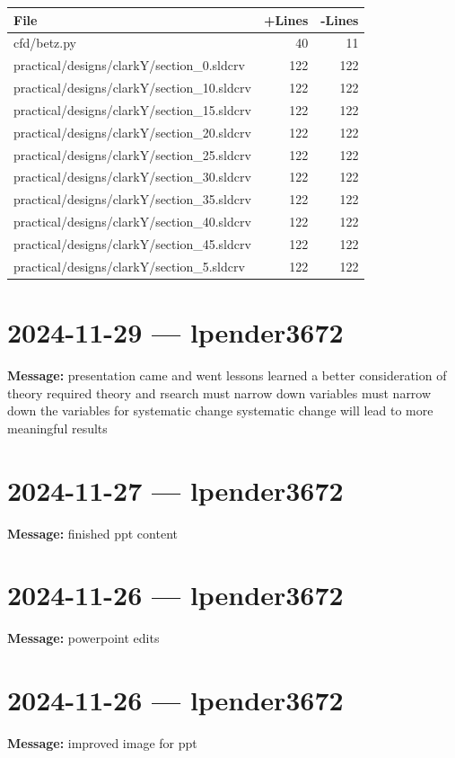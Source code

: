 \documentclass{article}
\begin{document}
\begin{longtable}{|p{10cm}|r|r|}
\hline \textbf{File} & \textbf{+Lines} & \textbf{-Lines} \\
\hline
cfd/betz.py & 40 & 11 \\
\hline
practical/designs/clarkY/section\_0.sldcrv & 122 & 122 \\
\hline
practical/designs/clarkY/section\_10.sldcrv & 122 & 122 \\
\hline
practical/designs/clarkY/section\_15.sldcrv & 122 & 122 \\
\hline
practical/designs/clarkY/section\_20.sldcrv & 122 & 122 \\
\hline
practical/designs/clarkY/section\_25.sldcrv & 122 & 122 \\
\hline
practical/designs/clarkY/section\_30.sldcrv & 122 & 122 \\
\hline
practical/designs/clarkY/section\_35.sldcrv & 122 & 122 \\
\hline
practical/designs/clarkY/section\_40.sldcrv & 122 & 122 \\
\hline
practical/designs/clarkY/section\_45.sldcrv & 122 & 122 \\
\hline
practical/designs/clarkY/section\_5.sldcrv & 122 & 122 \\
\hline
\end{longtable}

\section*{2024-11-29 --- lpender3672}
\textbf{Message:} presentation came and went lessons learned a better consideration of theory required theory and rsearch must narrow down variables must narrow down the variables for systematic change systematic change will lead to more meaningful results

\section*{2024-11-27 --- lpender3672}
\textbf{Message:} finished ppt content

\section*{2024-11-26 --- lpender3672}
\textbf{Message:} powerpoint edits

\section*{2024-11-26 --- lpender3672}
\textbf{Message:} improved image for ppt
\end{document}

